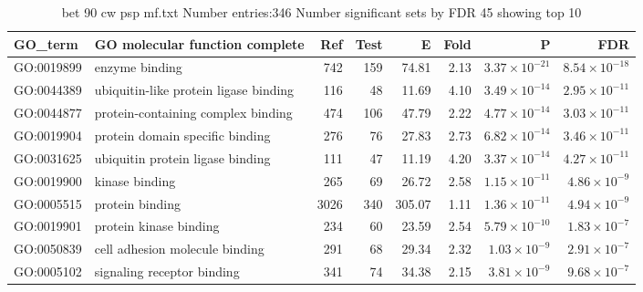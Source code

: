 \begin{table}[ht]
\centering
\begin{tabular}{llrrrrrr}
  \hline
GO\_term & GO molecular function complete & Ref & Test & E & Fold & P & FDR \\ 
  \hline
GO:0019899 & enzyme binding  & 742 & 159 & 74.81 & 2.13 & $3.37 \times 10^{-21}$ & $8.54 \times 10^{-18}$ \\ 
  GO:0044389 & ubiquitin-like protein ligase binding  & 116 & 48 & 11.69 & 4.10 & $3.49 \times 10^{-14}$ & $2.95 \times 10^{-11}$ \\ 
  GO:0044877 & protein-containing complex binding  & 474 & 106 & 47.79 & 2.22 & $4.77 \times 10^{-14}$ & $3.03 \times 10^{-11}$ \\ 
  GO:0019904 & protein domain specific binding  & 276 & 76 & 27.83 & 2.73 & $6.82 \times 10^{-14}$ & $3.46 \times 10^{-11}$ \\ 
  GO:0031625 & ubiquitin protein ligase binding  & 111 & 47 & 11.19 & 4.20 & $3.37 \times 10^{-14}$ & $4.27 \times 10^{-11}$ \\ 
  GO:0019900 & kinase binding  & 265 & 69 & 26.72 & 2.58 & $1.15 \times 10^{-11}$ & $4.86 \times 10^{-9}$ \\ 
  GO:0005515 & protein binding  & 3026 & 340 & 305.07 & 1.11 & $1.36 \times 10^{-11}$ & $4.94 \times 10^{-9}$ \\ 
  GO:0019901 & protein kinase binding  & 234 & 60 & 23.59 & 2.54 & $5.79 \times 10^{-10}$ & $1.83 \times 10^{-7}$ \\ 
  GO:0050839 & cell adhesion molecule binding  & 291 & 68 & 29.34 & 2.32 & $1.03 \times 10^{-9}$ & $2.91 \times 10^{-7}$ \\ 
  GO:0005102 & signaling receptor binding  & 341 & 74 & 34.38 & 2.15 & $3.81 \times 10^{-9}$ & $9.68 \times 10^{-7}$ \\ 
  \hline
\end{tabular}
\caption{bet 90 cw psp mf.txt Number entries:346 Number significant sets by FDR 45 showing top 10} 
\label{tab:bet 90 cw psp mf.txt Number entries:346 Number significant sets by FDR 45 showing top 10}
\end{table}

